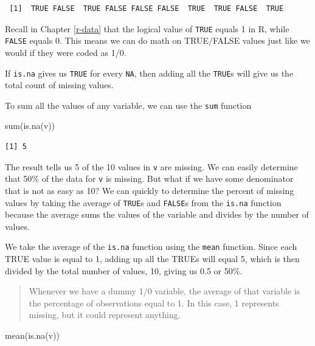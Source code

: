 \documentclass[
]{book}
\makeatletter
\newenvironment{Shaded}{\begin{snugshade}}{\end{snugshade}}
\newcommand{\FunctionTok}[1]{\textcolor[rgb]{0,0,0}{#1}}
\newcommand{\NormalTok}[1]{#1}
\newenvironment{kframe}{%
\medskip{}
\setlength{\fboxsep}{.8em}
 \def\at@end@of@kframe{}%
 \ifinner\ifhmode%
  \def\at@end@of@kframe{\end{minipage}}%
  \begin{minipage}{\columnwidth}%
 \fi\fi%
 \def\FrameCommand##1{\hskip\@totalleftmargin \hskip-\fboxsep
 \colorbox{shadecolor}{##1}\hskip-\fboxsep
     \hskip-\linewidth \hskip-\@totalleftmargin \hskip\columnwidth}%
 \MakeFramed {\advance\hsize-\width
   \@totalleftmargin\z@ \linewidth\hsize
   \@setminipage}}%
 {\par\unskip\endMakeFramed%
 \at@end@of@kframe}
\renewenvironment{Shaded}{\begin{kframe}}{\end{kframe}}
\makeatother
\begin{document}
\begin{verbatim}
 [1]  TRUE FALSE  TRUE FALSE FALSE FALSE  TRUE  TRUE FALSE  TRUE
\end{verbatim}

Recall in Chapter \ref{r-data} that the logical value of \texttt{TRUE} equals 1 in R, while \texttt{FALSE} equals 0. This means we can do math on TRUE/FALSE values just like we would if they were coded as 1/0.

If \texttt{is.na} gives us \texttt{TRUE} for every \texttt{NA}, then adding all the \texttt{TRUE}s will give us the total count of missing values.

To sum all the values of any variable, we can use the \texttt{sum} function

\begin{Shaded}
\begin{Highlighting}[]
\FunctionTok{sum}\NormalTok{(}\FunctionTok{is.na}\NormalTok{(v))}
\end{Highlighting}
\end{Shaded}

\begin{verbatim}
[1] 5
\end{verbatim}

The result tells us 5 of the 10 values in \texttt{v} are missing. We can easily determine that 50\% of the data for \texttt{v} is missing. But what if we have some denominator that is not as easy as 10? We can quickly to determine the percent of missing values by taking the average of \texttt{TRUE}s and \texttt{FALSE}s from the \texttt{is.na} function because the average sums the values of the variable and divides by the number of values.

We take the average of the \texttt{is.na} function using the \texttt{mean} function. Since each TRUE value is equal to 1, adding up all the TRUEs will equal 5, which is then divided by the total number of values, 10, giving us 0.5 or 50\%.

\begin{quote}
Whenever we have a dummy 1/0 variable, the average of that variable is the percentage of observations equal to 1. In this case, 1 represents missing, but it could represent anything.
\end{quote}

\begin{Shaded}
\begin{Highlighting}[]
\FunctionTok{mean}\NormalTok{(}\FunctionTok{is.na}\NormalTok{(v))}
\end{Highlighting}
\end{Shaded}
\end{document}
